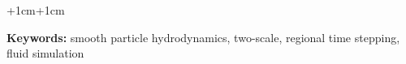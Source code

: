 \documentclass[a4paper,oneside]{bth}
\begin{document}
\begin{changemargin}{+1cm}{+1cm}



\par\vspace {1cm}
\noindent
\textbf{Keywords:} smooth particle hydrodynamics, two-scale, regional time stepping, fluid simulation 

\end{changemargin}

\listoffigures %
\listoftables %
\listofalgorithms %
\tableofcontents 
\end{document}

